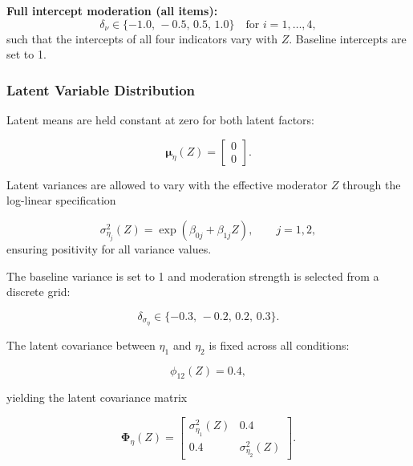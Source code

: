 \documentclass[
  man,
  floatsintext]{apa7}
\begin{document}
\textbf{Full intercept moderation (all items):}\\
\[
    \delta_{\nu} \in \{-1.0,\,-0.5,\,0.5,\,1.0\} \quad \text{for } i = 1,\dots,4,
  \] such that the intercepts of all four indicators vary with \(Z\).
Baseline intercepts are set to 1.

\subsubsection{Latent Variable
Distribution}\label{latent-variable-distribution}

Latent means are held constant at zero for both latent factors:

\[
\boldsymbol{\mu}_\eta(Z) = 
\begin{bmatrix}
0 \\[4pt]
0
\end{bmatrix}.
\]

Latent variances are allowed to vary with the effective moderator \(Z\)
through the log-linear specification

\[
\sigma^2_{\eta_j}(Z)
  = \exp\!\left(\beta_{0j} + \beta_{1j} Z\right),
\qquad j = 1,2,
\] ensuring positivity for all variance values.

The baseline variance is set to 1 and moderation strength is selected
from a discrete grid:

\[
\delta_{\sigma_\eta} \in \{-0.3,\,-0.2,\,0.2,\,0.3\}.
\]

The latent covariance between \(\eta_1\) and \(\eta_2\) is fixed across
all conditions:

\[
\phi_{12}(Z) = 0.4,
\]

yielding the latent covariance matrix

\begingroup
\raggedbottom

\[
\boldsymbol{\Phi}_\eta(Z)
=
\begin{bmatrix}
\sigma^2_{\eta_1}(Z) & 0.4 \\
0.4 & \sigma^2_{\eta_2}(Z)
\end{bmatrix}.
\]

\endgroup
\end{document}
